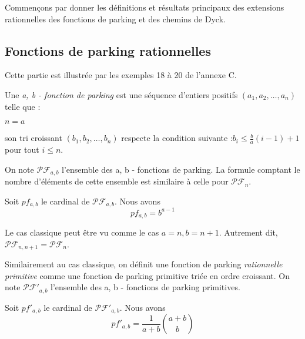 Commençons par donner les définitions et résultats principaux des extensions
rationnelles des fonctions de parking et des chemins de Dyck.

\subsection{Fonctions de parking rationnelles}

Cette partie est illustrée par les exemples 18 à 20 de l'annexe C.

\begin{definition}
    Une \emph{a, b - fonction de parking} est une séquence d'entiers
    positifs $(a_1, a_2, \ldots, a_n)$ telle que :\\
    \begin{itemize*}
        \item $n = a$\\
        \item son tri croissant $(b_1, b_2, \ldots, b_n)$ respecte la
        condition suivante :$b_i \leqslant \frac{b}{a}(i-1) + 1$ 
        pour tout $i \leqslant n$.
    \end{itemize*}
\end{definition}

On note $\mathcal{PF}_{a,b}$ l'ensemble des a, b - fonctions de parking.
La formule comptant le nombre d'éléments de cette ensemble est similaire
à celle pour $\mathcal{PF}_{n}$.

\begin{theorem}
    Soit $pf_{a,b}$ le cardinal de $\mathcal{PF}_{a,b}$.
    Nous avons $$pf_{a,b} = b^{a-1}$$
\end{theorem}

\begin{rem}
Le cas classique peut être vu comme le cas $a = n, b = n + 1$.
Autrement dit, $\mathcal{PF}_{n, n + 1} = \mathcal{PF}_n$.
\end{rem}

Similairement au cas classique, on définit une fonction de parking
\emph{rationnelle primitive} comme une fonction de parking primitive
triée en ordre croissant.
On note $\mathcal{PF'}_{a,b}$ l'ensemble des a, b - fonctions de parking
primitives.

\begin{theorem}
    Soit $pf'_{a,b}$ le cardinal de $\mathcal{PF'}_{a,b}$.
    Nous avons $$\displaystyle pf'_{a,b} = 
    \frac{1}{a + b} \binom{a + b}{b}$$
\end{theorem}

